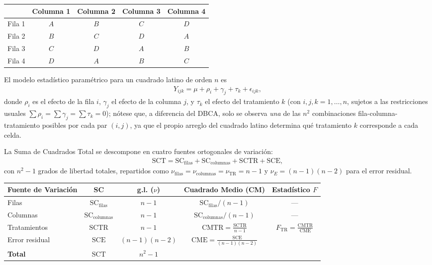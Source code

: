 \begin{center}
	\begin{tabular}{c|cccc}
		 & Columna 1 & Columna 2 & Columna 3 & Columna 4 \\ \hline
		Fila 1 & $A$ & $B$ & $C$ & $D$ \\
		Fila 2 & $B$ & $C$ & $D$ & $A$ \\
		Fila 3 & $C$ & $D$ & $A$ & $B$ \\
		Fila 4 & $D$ & $A$ & $B$ & $C$ \\
	\end{tabular}
\end{center}

El modelo estadístico paramétrico para un cuadrado latino de orden $n$ es
\begin{align}
	Y_{ijk} = \mu + \rho_i + \gamma_j + \tau_k + \epsilon_{ijk},
	\label{eq:modelo_cuadrado_latino}
\end{align}
donde $\rho_i$ es el efecto de la fila $i$, $\gamma_j$ el efecto de la columna $j$, y $\tau_k$ el efecto del tratamiento $k$ (con $i,j,k = 1,\ldots,n$, sujetos a las restricciones usuales $\sum \rho_i = \sum \gamma_j = \sum \tau_k = 0$); nótese que, a diferencia del DBCA, solo se observa \emph{una} de las $n^2$ combinaciones fila-columna-tratamiento posibles por cada par $(i,j)$, ya que el propio arreglo del cuadrado latino determina qué tratamiento $k$ corresponde a cada celda.

\begin{teorema}
	La Suma de Cuadrados Total se descompone en cuatro fuentes ortogonales de variación:
	\begin{align}
		\text{SCT} = \text{SC}_{\text{filas}} + \text{SC}_{\text{columnas}} + \text{SCTR} + \text{SCE},
	\end{align}
	con $n^2 - 1$ grados de libertad totales, repartidos como $\nu_{\text{filas}} = \nu_{\text{columnas}} = \nu_{\text{TR}} = n-1$ y $\nu_E = (n-1)(n-2)$ para el error residual.
\end{teorema}

\begin{center}
	\begin{tabular}{lcccc}
		\hline
		\textbf{Fuente de Variación} & \textbf{SC} & \textbf{g.l. ($\nu$)} & \textbf{Cuadrado Medio (CM)} & \textbf{Estadístico $F$} \\ \hline
		Filas & $\text{SC}_{\text{filas}}$ & $n-1$ & $\text{SC}_{\text{filas}}/(n-1)$ & --- \\ [1ex]
		Columnas & $\text{SC}_{\text{columnas}}$ & $n-1$ & $\text{SC}_{\text{columnas}}/(n-1)$ & --- \\ [1ex]
		Tratamientos & $\text{SCTR}$ & $n-1$ & $\text{CMTR} = \frac{\text{SCTR}}{n-1}$ & $F_{\text{TR}} = \frac{\text{CMTR}}{\text{CME}}$ \\ [1ex]
		Error residual & $\text{SCE}$ & $(n-1)(n-2)$ & $\text{CME} = \frac{\text{SCE}}{(n-1)(n-2)}$ & \\ [1ex] \hline
		\textbf{Total} & $\text{SCT}$ & $n^2 - 1$ & & \\ \hline
	\end{tabular}
\end{center}

